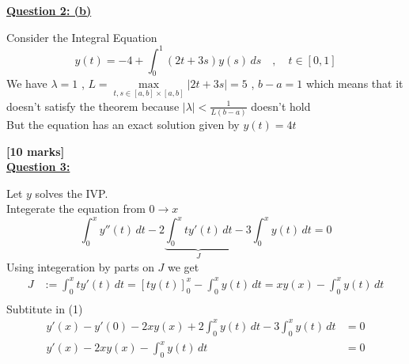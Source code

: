 \documentclass[]{article}
\begin{document}
\textbf{\underline{Question 2: (b)}}
\begin{adjustwidth}{1cm}{2cm}
    Consider the Integral Equation
    \[
        y(t) = -4 + \int_{0}^{1}(2t+3s)y(s) \,ds \quad,\quad  t \in [0,1]
    \]
    We have $\lambda = 1$ , $L = \max\limits_{t,s\in [a,b]\times[a,b]} |2t+3s| = 5$ , $b-a = 1$
    which means that it doesn't satisfy the theorem because $\displaystyle |\lambda|< \frac{1}{L(b-a)}$ doesn't hold
    \\
    But  the equation has an exact solution given by $y(t) = 4t$
\end{adjustwidth}
\textbf{[10 marks]}\\
\textbf{\underline{Question 3:}}
\begin{adjustwidth}{1cm}{2cm}
    Let $y$ solves the IVP.\\
    Integerate the equation from $0 \to x$
    \begin{equation}
        \int_{0}^{x} y''(t) \, dt -2\underbrace{\int_{0}^{x} t y'(t) \,dt}_J -3\int_{0}^{x}y(t) \,dt=0
    \end{equation}
    Using integeration by parts on $J$ we get
    \begin{align*}
        J & := \int_{0}^{x} t y'(t) \,dt = \left[t y(t)\right]_{0}^{x} - \int_{0}^{x}y(t) \,dt= xy(x) - \int_{0}^{x}y(t) \,dt \\
    \end{align*}
    Subtitute in (1)
    \begin{align*}
        y'(x) - y'(0) -2xy(x) + 2\int_{0}^{x}y(t) \,dt -3\int_{0}^{x}y(t) \,dt & =0
        \\
        y'(x) -2xy(x) -\int_{0}^{x}y(t) \,dt                                   & =0 \tag{2}
    \end{align*}


\end{adjustwidth}
\end{document}
